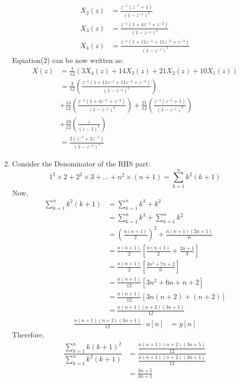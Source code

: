 \documentclass[journal,12pt,twocolumn]{IEEEtran}
\theoremstyle{remark}
\begin{document}
\begin{enumerate}[label=\alph*)]
\begin{align}
    X_2(z) &= \frac{z^{-1}(z^{-1}+1)}{(1-z^{-1})^3}\\
    X_3(z) &= \frac{z^{-1}(1+4z^{-1}+z^{-2})}{(1-z^{-1})^4}\\
    X_4(z) &= \frac{z^{-1}(1+11z^{-1}+11z^{-2}+z^{-3})}{(1-z^{-1})^5}
\end{align}
Equation(2) can be now written as:
\begin{align*}
    X(z) &=\frac{1}{12}(3X_4(z) + 14X_3(z) + 21X_2(z) + 10X_1(z)) \\
         &= \frac{3}{12}\left(\frac{z^{-1}(1+11z^{-1}+11z^{-2}+z^{-3})}{(1-z^{-1})^5}\right)\\ &+ \frac{14}{12}\left(\frac{z^{-1}(1+4z^{-1}+z^{-2})}{(1-z^{-1})^4}\right) 
         + \frac{21}{12}\left(\frac{z^{-1}(z^{-1}+1)}{(1-z^{-1})^3}\right)\\ &+ \frac{10}{12}\left(\frac{z}{(z - 1)^2}\right) \\
         &= \frac{2(z^{-2}+2z^{-1})}{(1-z^{-1})^5}
\end{align*}
\item Consider the Denominator of the RHS part:
\begin{equation*}
    1^2\times2 + 2^2\times3 +\dots + n^2\times(n+1) = \sum_{k=1}^n k^2(k+1)
\end{equation*}
Now,\\
\begin{align*}
     \sum_{k=1}^n k^2(k+1) &= \sum_{k=1}^n k^3+k^2\\
                           &=  \sum_{k=1}^n k^3 + \sum_{k=1}^n k^2\\
                           &=  \left(\frac{n(n+1)}{2}\right)^{\scriptstyle 2}+\frac{n(n+1)(2n+1)}{6}\\ 
                           &= \frac{n(n+1)}{2}\left[\frac{n(n+1)}{2} +\frac{2n+1}{3}\right]\\
                           &= \frac{n(n+1)}{2}\left[\frac{3n^2+7n+2}{6}\right]\\
                           &= \frac{n(n+1)}{12}\left[3n^2+6n + n+2\right]\\
                           &= \frac{n(n+1)}{12}\left[3n(n+2)+(n+2)\right]\\
                           &= \frac{n(n+1)(n+2)(3n+1)}{12}
\end{align*}
\begin{align*}
    \frac{n(n+1)(n+2)(3n+1)}{12}\cdot u[n] &= y[n]
\end{align*}
\vspace{1cm}
Therefore,
\begin{align*}
     \dfrac{ \sum_{k=1}^n k(k+1)^2 }{\sum_{k=1}^n k^2(k+1)} &= \dfrac{\frac{n(n+1)(n+2)(3n+5)}{12}}{\frac{n(n+1)(n+2)(3n+1)}{12}}\\
                                                            &= \frac{3n+5}{3n+1}
\end{align*}
\vspace{0.7cm}


\end{enumerate}
\end{document}
